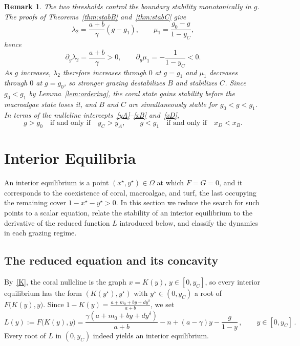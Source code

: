 \documentclass[reqno,11pt]{amsart}
\newtheorem{rem}[thm]{Remark}
\numberwithin{equation}{section}
\begin{document}
\begin{rem}\label{rem:thresholds}
The two thresholds control the boundary stability monotonically in $g$. The proofs of Theorems~\ref{thm:stabB} and~\ref{thm:stabC} give
\[
\lambda_2=\frac{a+b}{\gamma}(g-g_1),\qquad
\mu_1=\frac{g_0-g}{1-y_C},
\]
hence
\[
\partial_g\lambda_2=\frac{a+b}{\gamma}>0,\qquad
\partial_g\mu_1=-\frac{1}{1-y_C}<0 .
\]
As $g$ increases, $\lambda_2$ therefore increases through $0$ at $g=g_1$ and $\mu_1$ decreases through $0$ at $g=g_0$, so stronger grazing destabilizes $B$ and stabilizes $C$. Since $g_0<g_1$ by Lemma~\ref{lem:ordering}, the coral state gains stability before the macroalgae state loses it, and $B$ and $C$ are simultaneously stable for $g_0<g<g_1$. In terms of the nullcline intercepts~\eqref{yA}--\eqref{xB} and~\eqref{xD},
\[
g>g_0 \quad\text{if and only if}\quad y_C>y_A,
\qquad
g<g_1 \quad\text{if and only if}\quad x_D<x_B .
\]
\end{rem}

\bigskip

\section{Interior Equilibria}\label{sec:interior}

An interior equilibrium is a point $(x^\star,y^\star)\in\Omega$ at which $F=G=0$, and it corresponds to the coexistence of coral, macroalgae, and turf, the last occupying the remaining cover $1-x^\star-y^\star>0$. In this section we reduce the search for such points to a scalar equation, relate the stability of an interior equilibrium to the derivative of the reduced function $L$ introduced below, and classify the dynamics in each grazing regime.

\smallskip

\subsection{The reduced equation and its concavity}\label{subsec:reduced}

By~\eqref{K}, the coral nullcline is the graph $x=K(y)$, $y\in[0,y_C]$, so every interior equilibrium has the form $(K(y^\star),y^\star)$ with $y^\star\in(0,y_C)$ a root of $F\big(K(y),y\big)$. Since $1-K(y)=\tfrac{a+m_0+by+dy^{\delta}}{a+b}$, we set
\begin{equation}\label{Ldef}
L(y):=F\big(K(y),y\big)=\frac{\gamma(a+m_0+by+dy^{\delta})}{a+b}-n+(a-\gamma)y-\frac{g}{1-y}\,,\qquad y\in[0,y_C]\,.
\end{equation}
Every root of $L$ in $(0,y_C)$ indeed yields an interior equilibrium.
\end{document}
